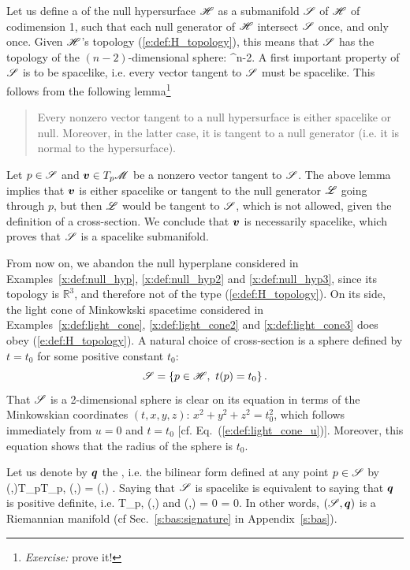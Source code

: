 Let us define a 
of the null hypersurface $\mathscr{H}$
as a submanifold $\mathscr{S}$ of $\mathscr{H}$ of codimension 1,
such that each null generator of $\mathscr{H}$ intersect $\mathscr{S}$ once, and only once.
Given $\mathscr{H}$'s topology (\ref{e:def:H_topology}), this means that $\mathscr{S}$ has the
topology of the $(n-2)$-dimensional sphere:
\be
    \Sp \simeq {}^{n-2}.
\ee
A first important property of $\mathscr{S}$ is to be spacelike,
i.e. every vector
tangent to $\mathscr{S}$ must be spacelike. This follows from the following lemma\footnote{\emph{Exercise:} prove it!}
\begin{quote}
Every nonzero vector tangent to a null hypersurface is either spacelike or null.
Moreover, in the latter case, it is tangent to a null generator (i.e. it is normal
to the hypersurface).
\end{quote}
Let $p \in \mathscr{S}$ and $\bm{v}\in T_p\mathscr{M}$ be a nonzero vector tangent to $\mathscr{S}$.
The above lemma implies that $\bm{v}$ is either spacelike or tangent to the
null generator $\mathscr{L}$ going through $p$, but then $\mathscr{L}$ would be tangent to $\mathscr{S}$,
which is not allowed, given the definition of a cross-section. We conclude
that $\bm{v}$ is necessarily spacelike, which proves that $\mathscr{S}$ is a spacelike
submanifold.

\begin{example} \label{x:def:light_cone4}
From now on, we abandon the null hyperplane considered in Examples~\ref{x:def:null_hyp},
\ref{x:def:null_hyp2} and \ref{x:def:null_hyp3}, since its topology is $\mathbb{R}^3$,
and therefore not of the type (\ref{e:def:H_topology}).
On its side, the light cone of Minkowkski spacetime considered in Examples~\ref{x:def:light_cone},
\ref{x:def:light_cone2} and \ref{x:def:light_cone3} does obey (\ref{e:def:H_topology}).
A natural choice of cross-section is a sphere defined by $t=t_0$ for some positive constant $t_0$:
\[
    \mathscr{S} = \left\{ p \in \mathscr{H},\  t(p) = t_0 \right\} .
\]
That $\mathscr{S}$ is a 2-dimensional sphere is clear on its equation in terms
of the Minkowskian coordinates $(t,x,y,z)$:
$x^2+y^2+z^2 = t_0^2$, which follows immediately from $u=0$ and $t = t_0$
[cf. Eq.~(\ref{e:def:light_cone_u})]. Moreover, this equation shows that the
radius of the sphere is $t_0$.
\end{example}

Let us denote by $\bm{q}$ the
,
i.e. the bilinear form defined at any point $p\in\mathscr{S}$ by
\be \label{e:def:def_q_S}
    \forall (,)\in T_p\Sp\times T_p\Sp, \quad
     (,) = (,) .
\ee
Saying that $\mathscr{S}$ is spacelike is equivalent to saying that $\bm{q}$ is
positive definite, i.e.
\be
    \forall {}\in T_p\Sp,\quad
    (,)  \quad \mbox{and} \quad
    (,) = 0 \iff {} = 0.
\ee
In other words, $(\mathscr{S}, \bm{q})$ is a Riemannian manifold (cf Sec.~\ref{s:bas:signature} in Appendix~\ref{s:bas}).

